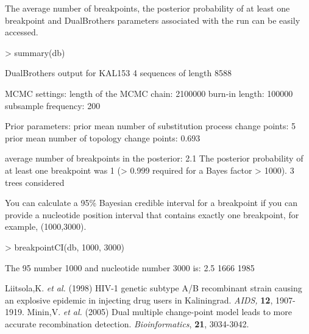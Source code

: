 \documentclass[12pt]{article}
\begin{document}
The average number of breakpoints, the posterior probability of at least one breakpoint and DualBrothers parameters associated with the run can be easily accessed.
\begin{Schunk}
\begin{Sinput}
> summary(db)
\end{Sinput}
\begin{Soutput}
DualBrothers output for KAL153 
4 sequences of length 8588 

MCMC settings: 
length of the MCMC chain: 2100000 
burn-in length: 100000 
subsample frequency: 200 

Prior parameters: 
prior mean number of substitution process change points: 5 
prior mean number of topology change points: 0.693 

average number of breakpoints in the posterior: 2.1 
The posterior probability of at least one breakpoint was 1 
(> 0.999  required for a Bayes factor > 1000). 
3 trees considered 
\end{Soutput}
\end{Schunk}

You can calculate a 95\% Bayesian credible interval for a breakpoint if you can provide a nucleotide position interval that contains exactly one breakpoint, for example, (1000,3000).
\begin{Schunk}
\begin{Sinput}
> breakpointCI(db, 1000, 3000)
\end{Sinput}
\begin{Soutput}
The 95% credible interval for a single break point between nucleotide 
number 1000 and nucleotide number 3000 is:
 2.5% 97.5% 
 1666  1985 
\end{Soutput}
\end{Schunk}



%

\begin{thebibliography}{apalike}
 Liitsola,K. {\em et al.} (1998) HIV-1 genetic subtype A/B recombinant strain causing an explosive epidemic in injecting drug users in Kaliningrad. {\em AIDS,} {\bf 12}, 1907-1919.
 Minin,V. {\em et al.} (2005) Dual multiple change-point model leads to more accurate recombination detection. {\em Bioinformatics}, {\bf 21}, 3034-3042.
\end{thebibliography}
\end{document}
